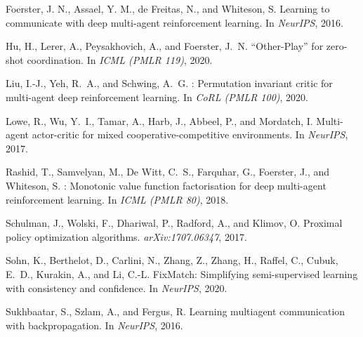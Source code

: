 \documentclass[nohyperref]{article}
\begin{document}

\begin{thebibliography}{}
Foerster, J. N., Assael, Y. M., de Freitas, N., and Whiteson, S.
\newblock Learning to communicate with deep multi-agent reinforcement learning.
\newblock In \emph{NeurIPS}, 2016.

Hu, H., Lerer, A., Peysakhovich, A., and Foerster, J.~N.
\newblock ``Other-Play'' for zero-shot coordination.
\newblock In \emph{ICML (PMLR 119)}, 2020.

Liu, I.-J., Yeh, R.~A., and Schwing, A.~G.
: Permutation invariant critic for multi-agent deep reinforcement learning.
\newblock In \emph{CoRL (PMLR 100)}, 2020.

Lowe, R., Wu, Y.~I., Tamar, A., Harb, J., Abbeel, P., and Mordatch, I.
\newblock Multi-agent actor-critic for mixed cooperative-competitive environments.
\newblock In \emph{NeurIPS}, 2017.

Rashid, T., Samvelyan, M., {De Witt}, C.~S., Farquhar, G., Foerster, J., and Whiteson, S.
: Monotonic value function factorisation for deep multi-agent reinforcement learning.
\newblock In \emph{ICML (PMLR 80)}, 2018.

Schulman, J., Wolski, F., Dhariwal, P., Radford, A., and Klimov, O.
\newblock Proximal policy optimization algorithms.
\newblock \emph{arXiv:1707.06347}, 2017.

Sohn, K., Berthelot, D., Carlini, N., Zhang, Z., Zhang, H., Raffel, C., Cubuk, E.~D., Kurakin, A., and Li, C.-L.
\newblock FixMatch: Simplifying semi-supervised learning with consistency and confidence.
\newblock In \emph{NeurIPS}, 2020.

Sukhbaatar, S., Szlam, A., and Fergus, R.
\newblock Learning multiagent communication with backpropagation.
\newblock In \emph{NeurIPS}, 2016.


\end{thebibliography}
\end{document}
